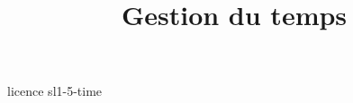 \documentclass {beamer}
\title {Gestion du temps}
\begin{document}
 {licence}
 {sl1-5-time}
\end{document}
